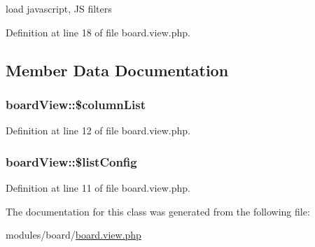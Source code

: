 load javascript, J\-S filters

Definition at line 18 of file board.\-view.\-php.



\subsection{Member Data Documentation}
\hypertarget{classboardView_a44f0d3c92b73c34329708f5fe44652cc}{
\subsubsection[{\$column\-List}]{\setlength{\rightskip}{0pt plus 5cm}board\-View\-::\$column\-List}}\label{classboardView_a44f0d3c92b73c34329708f5fe44652cc}


Definition at line 12 of file board.\-view.\-php.

\hypertarget{classboardView_a8d64b7032d159a960972ae38f76897f8}{
\subsubsection[{\$list\-Config}]{\setlength{\rightskip}{0pt plus 5cm}board\-View\-::\$list\-Config}}\label{classboardView_a8d64b7032d159a960972ae38f76897f8}


Definition at line 11 of file board.\-view.\-php.



The documentation for this class was generated from the following file\-:\begin{DoxyCompactItemize}
\item 
modules/board/\hyperlink{board_8view_8php}{board.\-view.\-php}\end{DoxyCompactItemize}
